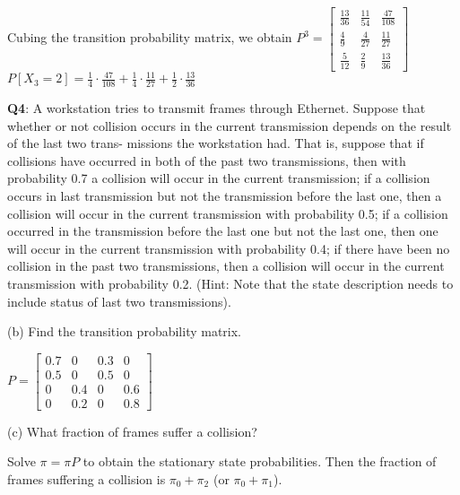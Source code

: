 \documentclass[10pt]{article}
\begin{document}
\begin{multicols*}{3}
Cubing the transition probability matrix, we obtain $P^3 = \begin{bmatrix}\frac{13}{36} & \frac{11}{54} & \frac{47}{108} \\ \frac{4}{9} & \frac{4}{27} & \frac{11}{27} \\ \frac{5}{12} & \frac{2}{9} & \frac{13}{36}\end{bmatrix}$
$P[X_3=2]=\frac{1}{4}\cdot\frac{47}{108}+\frac{1}{4}\cdot\frac{11}{27}+\frac{1}{2}\cdot\frac{13}{36}$



{\bf Q4}: A workstation tries to transmit frames through Ethernet. Suppose that whether or not collision occurs in the current transmission depends on the result of the last two trans- missions the workstation had. That is, suppose that if collisions have occurred in both of the past two transmissions, then with probability 0.7 a collision will occur in the current transmission; if a collision occurs in last transmission but not the transmission before the last one, then a collision will occur in the current transmission with probability 0.5; if a collision occurred in the transmission before the last one but not the last one, then one will occur in the current transmission with probability 0.4; if there have been no collision in the past two transmissions, then a collision will occur in the current transmission with probability 0.2. (Hint: Note that the state description needs to include status of last two transmissions).

(b) Find the transition probability matrix.

$P=\begin{bmatrix}0.7 & 0 & 0.3 & 0 \\ 0.5 & 0 & 0.5 & 0 \\ 0 & 0.4 & 0 & 0.6 \\ 0 & 0.2 & 0 & 0.8\end{bmatrix}$

(c) What fraction of frames suffer a collision?

Solve $\pi = \pi P$ to obtain the stationary state probabilities. Then the fraction of frames suffering a collision is $\pi_0 + \pi_2$ (or $\pi_0 + \pi_1$).

\end{multicols*}
\end{document}
